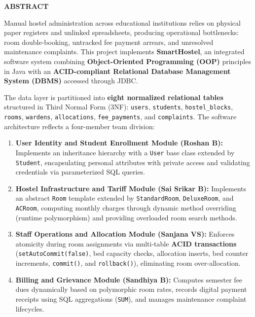 \documentclass[12pt,a4paper]{report}
\begin{document}
\newpage

\begin{center}
{\Large \textbf{ABSTRACT}\par}
\end{center}
\vspace{0.4cm}

Manual hostel administration across educational institutions relies on physical paper registers and unlinked spreadsheets, producing operational bottlenecks: room double-booking, untracked fee payment arrears, and unresolved maintenance complaints. This project implements \textbf{SmartHostel}, an integrated software system combining \textbf{Object-Oriented Programming (OOP)} principles in Java with an \textbf{ACID-compliant Relational Database Management System (DBMS)} accessed through JDBC.

The data layer is partitioned into \textbf{eight normalized relational tables} structured in Third Normal Form (3NF): \texttt{users}, \texttt{students}, \texttt{hostel\_blocks}, \texttt{rooms}, \texttt{wardens}, \texttt{allocations}, \texttt{fee\_payments}, and \texttt{complaints}. The software architecture reflects a four-member team division:
\begin{enumerate}
\item \textbf{User Identity and Student Enrollment Module (Roshan B):} Implements an inheritance hierarchy with a \texttt{User} base class extended by \texttt{Student}, encapsulating personal attributes with private access and validating credentials via parameterized SQL queries.
\item \textbf{Hostel Infrastructure and Tariff Module (Sai Srikar B):} Implements an abstract \texttt{Room} template extended by \texttt{StandardRoom}, \texttt{DeluxeRoom}, and \texttt{ACRoom}, computing monthly charges through dynamic method overriding (runtime polymorphism) and providing overloaded room search methods.
\item \textbf{Staff Operations and Allocation Module (Sanjana VS):} Enforces atomicity during room assignments via multi-table \textbf{ACID transactions} (\texttt{setAutoCommit(false)}, bed capacity checks, allocation inserts, bed counter increments, \texttt{commit()}, and \texttt{rollback()}), eliminating room over-allocation.
\item \textbf{Billing and Grievance Module (Sandhiya B):} Computes semester fee dues dynamically based on polymorphic room rates, records digital payment receipts using SQL aggregations (\texttt{SUM}), and manages maintenance complaint lifecycles.
\end{enumerate}
\end{document}
